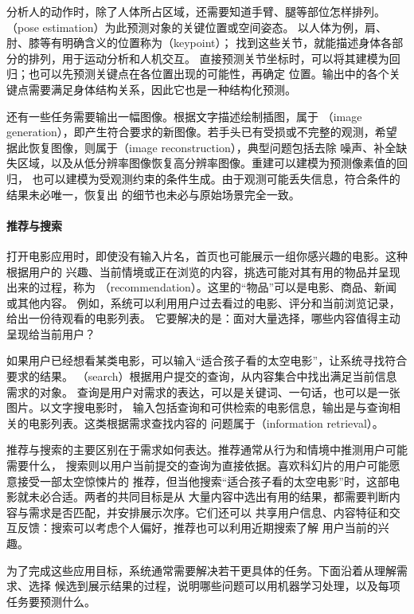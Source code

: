 分析人的动作时，除了人体所占区域，还需要知道手臂、腿等部位怎样排列。
（pose estimation）为此预测对象的关键位置或空间姿态。
以人体为例，肩、肘、膝等有明确含义的位置称为（keypoint）；
找到这些关节，就能描述身体各部分的排列，用于运动分析和人机交互。
直接预测关节坐标时，可以将其建模为回归；也可以先预测关键点在各位置出现的可能性，再确定
位置。输出中的各个关键点需要满足身体结构关系，因此它也是一种结构化预测。

还有一些任务需要输出一幅图像。根据文字描述绘制插图，属于
（image generation），即产生符合要求的新图像。若手头已有受损或不完整的观测，希望
据此恢复图像，则属于（image reconstruction），典型问题包括去除
噪声、补全缺失区域，以及从低分辨率图像恢复高分辨率图像。重建可以建模为预测像素值的回归，
也可以建模为受观测约束的条件生成。由于观测可能丢失信息，符合条件的结果未必唯一，恢复出
的细节也未必与原始场景完全一致。

\paragraph{推荐与搜索}
打开电影应用时，即使没有输入片名，首页也可能展示一组你感兴趣的电影。这种根据用户的
兴趣、当前情境或正在浏览的内容，挑选可能对其有用的物品并呈现出来的过程，称为
（recommendation）。这里的“物品”可以是电影、商品、新闻或其他内容。
例如，系统可以利用用户过去看过的电影、评分和当前浏览记录，给出一份待观看的电影列表。
它要解决的是：面对大量选择，哪些内容值得主动呈现给当前用户？

如果用户已经想看某类电影，可以输入“适合孩子看的太空电影”，让系统寻找符合要求的结果。
（search）根据用户提交的查询，从内容集合中找出满足当前信息需求的对象。
查询是用户对需求的表达，可以是关键词、一句话，也可以是一张图片。以文字搜电影时，
输入包括查询和可供检索的电影信息，输出是与查询相关的电影列表。这类根据需求查找内容的
问题属于（information retrieval）。

推荐与搜索的主要区别在于需求如何表达。推荐通常从行为和情境中推测用户可能需要什么，
搜索则以用户当前提交的查询为直接依据。喜欢科幻片的用户可能愿意接受一部太空惊悚片的
推荐，但当他搜索“适合孩子看的太空电影”时，这部电影就未必合适。两者的共同目标是从
大量内容中选出有用的结果，都需要判断内容与需求是否匹配，并安排展示次序。它们还可以
共享用户信息、内容特征和交互反馈：搜索可以考虑个人偏好，推荐也可以利用近期搜索了解
用户当前的兴趣。

为了完成这些应用目标，系统通常需要解决若干更具体的任务。下面沿着从理解需求、选择
候选到展示结果的过程，说明哪些问题可以用机器学习处理，以及每项任务要预测什么。

